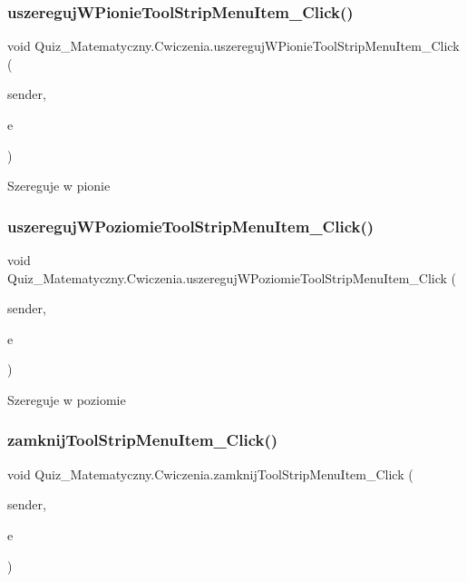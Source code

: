 \subsubsection{\texorpdfstring{uszeregujWPionieToolStripMenuItem\_Click()}{uszeregujWPionieToolStripMenuItem\_Click()}}
{\footnotesize\ttfamily void Quiz\+\_\+\+Matematyczny.\+Cwiczenia.\+uszereguj\+W\+Pionie\+Tool\+Strip\+Menu\+Item\+\_\+\+Click (\begin{DoxyParamCaption}\item[{object}]{sender,  }\item[{Event\+Args}]{e }\end{DoxyParamCaption})\hspace{0.3cm}{\ttfamily [private]}}

Szereguje w pionie \mbox{\label{class_quiz___matematyczny_1_1_cwiczenia_a1b5806013f517d8540b3c701b0744f9e}} 
\subsubsection{\texorpdfstring{uszeregujWPoziomieToolStripMenuItem\_Click()}{uszeregujWPoziomieToolStripMenuItem\_Click()}}
{\footnotesize\ttfamily void Quiz\+\_\+\+Matematyczny.\+Cwiczenia.\+uszereguj\+W\+Poziomie\+Tool\+Strip\+Menu\+Item\+\_\+\+Click (\begin{DoxyParamCaption}\item[{object}]{sender,  }\item[{Event\+Args}]{e }\end{DoxyParamCaption})\hspace{0.3cm}{\ttfamily [private]}}

Szereguje w poziomie \mbox{\label{class_quiz___matematyczny_1_1_cwiczenia_a7a298c65928455d299e07bd3ad27dc37}} 
\subsubsection{\texorpdfstring{zamknijToolStripMenuItem\_Click()}{zamknijToolStripMenuItem\_Click()}}
{\footnotesize\ttfamily void Quiz\+\_\+\+Matematyczny.\+Cwiczenia.\+zamknij\+Tool\+Strip\+Menu\+Item\+\_\+\+Click (\begin{DoxyParamCaption}\item[{object}]{sender,  }\item[{Event\+Args}]{e }\end{DoxyParamCaption})\hspace{0.3cm}{\ttfamily [private]}}

